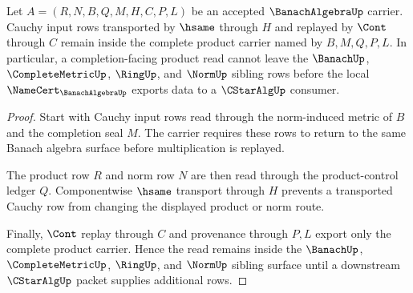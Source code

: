 \begin{theorem}
\label{thm:banach-algebra-cauchy-product-stability}
Let $A=(R,N,B,Q,M,H,C,P,L)$ be an accepted $\BanachAlgebraUp$ carrier. Cauchy input rows transported by $\hsame$ through $H$ and replayed by $\Cont$ through $C$ remain inside the complete product carrier named by $B,M,Q,P,L$. In particular, a completion-facing product read cannot leave the $\BanachUp$, $\CompleteMetricUp$, $\RingUp$, and $\NormUp$ sibling rows before the local $\NameCert_{\BanachAlgebraUp}$ exports data to a $\CStarAlgUp$ consumer.
\end{theorem}
\begin{proof}
Start with Cauchy input rows read through the norm-induced metric of $B$ and the completion seal $M$. The carrier requires these rows to return to the same Banach algebra surface before multiplication is replayed.

The product row $R$ and norm row $N$ are then read through the product-control ledger $Q$. Componentwise $\hsame$ transport through $H$ prevents a transported Cauchy row from changing the displayed product or norm route.

Finally, $\Cont$ replay through $C$ and provenance through $P,L$ export only the complete product carrier. Hence the read remains inside the $\BanachUp$, $\CompleteMetricUp$, $\RingUp$, and $\NormUp$ sibling surface until a downstream $\CStarAlgUp$ packet supplies additional rows.
\end{proof}

